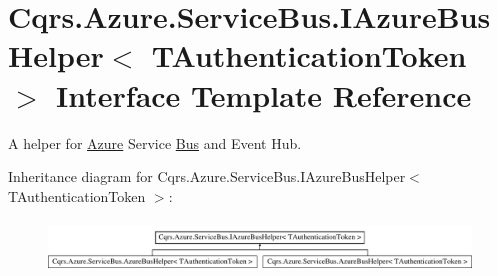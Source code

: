 \hypertarget{interfaceCqrs_1_1Azure_1_1ServiceBus_1_1IAzureBusHelper}{}\section{Cqrs.\+Azure.\+Service\+Bus.\+I\+Azure\+Bus\+Helper$<$ T\+Authentication\+Token $>$ Interface Template Reference}
\label{interfaceCqrs_1_1Azure_1_1ServiceBus_1_1IAzureBusHelper}


A helper for \hyperlink{namespaceCqrs_1_1Azure}{Azure} Service \hyperlink{namespaceCqrs_1_1Bus}{Bus} and Event Hub.  


Inheritance diagram for Cqrs.\+Azure.\+Service\+Bus.\+I\+Azure\+Bus\+Helper$<$ T\+Authentication\+Token $>$\+:\begin{figure}[H]
\begin{center}
\leavevmode
\includegraphics[height=1.407035cm]{interfaceCqrs_1_1Azure_1_1ServiceBus_1_1IAzureBusHelper}
\end{center}
\end{figure}
